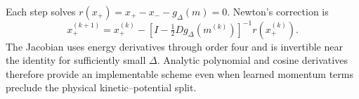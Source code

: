 Each step solves $r(x_+)=x_+-x_--g_\Delta(m)=0$. Newton's correction is
\begin{equation}
 x_+^{(k+1)}=x_+^{(k)}-
 \left[I-\tfrac12Dg_\Delta(m^{(k)})\right]^{-1}r(x_+^{(k)}).
 \label{eq:core-central-newton}
\end{equation}
The Jacobian uses energy derivatives through order four and is invertible
near the identity for sufficiently small $\Delta$. Analytic polynomial
and cosine derivatives therefore provide an implementable scheme even
when learned momentum terms preclude the physical kinetic--potential split.
